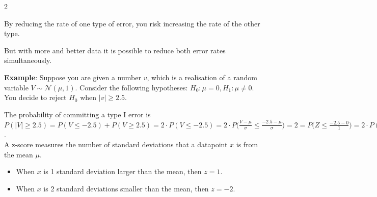 \begin{paracol}{2}

\switchcolumn

By reducing the rate of one type of error, you risk increasing the rate of the other type.

But with more and better data it is possible to reduce both error rates simultaneously.


\textbf{Example}: Suppose you are given a number $v$, which is a realisation of a random variable $V \sim \mathcal{N}(\mu, 1)$. Consider the following hypotheses: $H_0: \mu = 0, H_1: \mu\neq 0$. You decide to reject $H_0$ when $|v| \geq 2.5$.

The probability of committing a type I error is $P(|V| \geq 2.5) = P(V \leq -2.5) + P(V \geq 2.5) = 2 \cdot P(V \leq -2.5) = 2 \cdot P \big( \frac{V - \mu}{\sigma} \leq \frac{-2.5 - \mu}{\sigma} \big) = 2 = P \big( Z \leq \frac{-2.5-0}{1} \big) = 2 \cdot P(Z \leq -2.5) = 2 \cdot 0.0062 = 0.0124$. \\

A z-score measures the number of standard deviations that a datapoint $x$ is from the mean $\mu$.

\begin{itemize}
    \item When $x$ is 1 standard deviation larger than the mean, then $z = 1$.
    \item When $x$ is 2 standard deviations smaller than the mean, then $z = -2$.
\end{itemize}

\end{paracol}

